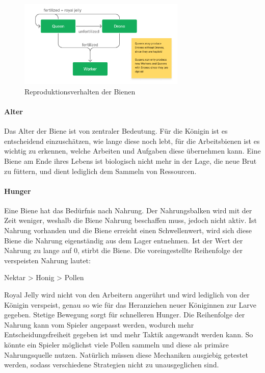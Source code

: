 \begin{figure}
    \begin{center}
        \includegraphics[width=300px]{0.bilder/reproductionloop.png}
    \end{center}
    \caption{Reproduktionsverhalten der Bienen} \label{image:reproductionloop}
\end{figure}

\paragraph{Alter} 
Das Alter der Biene ist von zentraler Bedeutung. Für die Königin ist es entscheidend einzuschätzen, wie lange diese noch lebt, für die Arbeitsbienen ist es wichtig zu erkennen, welche Arbeiten und Aufgaben diese übernehmen kann. Eine Biene am Ende ihres Lebens ist biologisch nicht mehr in der Lage, die neue Brut zu füttern, und dient lediglich dem Sammeln von Ressourcen.

\paragraph{Hunger} 
Eine Biene hat das Bedürfnis nach Nahrung. Der Nahrungsbalken wird mit der Zeit weniger, weshalb die Biene Nahrung beschaffen muss, jedoch nicht aktiv. Ist Nahrung vorhanden und die Biene erreicht einen Schwellenwert, wird sich diese Biene die Nahrung eigenständig aus dem Lager entnehmen. Ist der Wert der Nahrung zu lange auf 0, stirbt die Biene. Die voreingestellte Reihenfolge der verspeisten Nahrung lautet:

\begin{center}
    Nektar > Honig > Pollen
\end{center} Royal Jelly wird nicht von den Arbeitern angerührt und wird lediglich von der Königin verspeist, genau so wie für das Heranziehen neuer Königinnen zur Larve gegeben. Stetige Bewegung sorgt für schnelleren Hunger. Die Reihenfolge der Nahrung kann vom Spieler angepasst werden, wodurch mehr Entscheidungsfreiheit gegeben ist und mehr Taktik angewandt werden kann. So könnte ein Spieler möglichst viele Pollen sammeln und diese als primäre Nahrungsquelle nutzen. Natürlich müssen diese Mechaniken ausgiebig getestet werden, sodass verschiedene Strategien nicht zu unausgeglichen sind.

